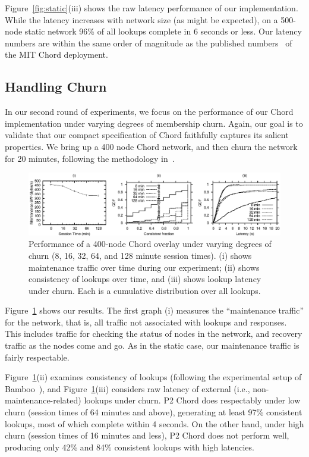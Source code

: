 \documentclass{sig-alt-full}
\def\Sys{P2\xspace}
\begin{document}
Figure~\ref{fig:static}(iii) shows the raw latency performance of our
implementation.  While the latency increases with network size
(as might be expected), on a 500-node static network 96\% of all lookups 
complete in 6 seconds or less. Our latency numbers are within the same
order of magnitude as the published numbers~\cite{chord} of the MIT Chord deployment.

\subsection{Handling Churn}
In our second round of experiments, we focus on the performance of our
Chord implementation under varying degrees of membership churn.
Again, our goal is to validate that our compact specification of Chord
faithfully captures its salient properties.   We bring up a 400 node
Chord network, and then churn the network for 20 minutes, following
the methodology in~\cite{rhea_usenix_2004}.   

\begin{figure}[t]
\centerline{\includegraphics{results/newgraphs/churn/churn}}
\caption{Performance of a 400-node Chord overlay under varying
degrees of churn (8, 16, 32, 64, and 128 minute session times).
(i) shows maintenance traffic over time during our
experiment; (ii) shows consistency of lookups
over time, and (iii) shows lookup
latency under churn.  Each is a
cumulative distribution over all lookups. }
\label{fig:churn}
\end{figure}

Figure~\ref{fig:churn} shows our results.  The
first graph (i) measures the ``maintenance traffic'' for the network,
that is, all traffic not associated with lookups and responses.  This
includes traffic for checking the status of nodes in the network, and
recovery traffic as the nodes come and go.  As in the static case, our
maintenance traffic is fairly respectable.

Figure~\ref{fig:churn}(ii) examines consistency of lookups
(following the experimental setup of Bamboo~\cite{rhea_usenix_2004}),
and Figure~\ref{fig:churn}(iii)
considers raw latency of external (i.e., non-maintenance-related) lookups
under churn. \Sys Chord does respectably under low churn (session times
of 64 minutes and above), generating at least 97\% consistent
lookups, most of which complete within 4 seconds. On the other hand,
under high churn (session times of 16 minutes and less), \Sys Chord does not
perform well, producing only 42\% and 84\% consistent lookups with high latencies.
\end{document}
